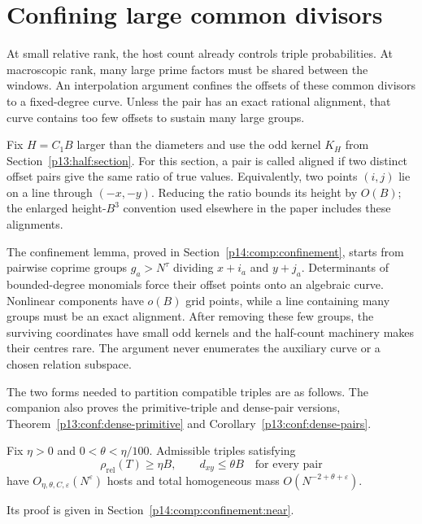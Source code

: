\section{Confining large common divisors}
\label{p13:conf:section}

At small relative rank, the host count already controls
triple probabilities. At macroscopic rank, many large
prime factors must be shared between the windows.
An interpolation argument confines the offsets of these
common divisors to a fixed-degree curve. Unless the pair
has an exact rational alignment, that curve contains too
few offsets to sustain many large groups.

Fix \(H=C_1B\) larger than the diameters and use the odd
kernel \(K_H\) from Section~\ref{p13:half:section}.
For this section, a pair is called aligned if two distinct
offset pairs give the same ratio of true values.
Equivalently, two points \((i,j)\) lie on a line through
\((-x,-y)\). Reducing the ratio bounds its height by
\(O(B)\); the enlarged height-\(B^3\) convention used
elsewhere in the paper includes these alignments.


The confinement lemma, proved in Section~\ref{p14:comp:confinement},
starts from pairwise coprime groups $g_a>N^\tau$ dividing
$x+i_a$ and $y+j_a$.  Determinants of bounded-degree monomials force
their offset points onto an algebraic curve.  Nonlinear components
have $o(B)$ grid points, while a line containing many groups must be
an exact alignment.  After removing these few groups, the surviving
coordinates have small odd kernels and the half-count machinery makes
their centres rare.  The argument never enumerates the auxiliary curve
or a chosen relation subspace.

The two forms needed to partition compatible triples are as follows.
The companion also proves the primitive-triple and dense-pair versions,
Theorem~\ref{p13:conf:dense-primitive} and
Corollary~\ref{p13:conf:dense-pairs}.

\begin{proposition}
\label{p13:conf:near-primitive}
Fix \(\eta>0\) and \(0<\theta<\eta/100\).
Admissible triples satisfying
\[
 \rho_{\mathrm{rel}}(T)\ge\eta B,\qquad
 d_{xy}\le\theta B\quad\text{for every pair}
\]
have \(O_{\eta,\theta,C,\varepsilon}(N^\varepsilon)\)
hosts and total homogeneous mass
\(O(N^{-2+\theta+\varepsilon})\).
\end{proposition}

Its proof is given in Section~\ref{p14:comp:confinement:near}.

